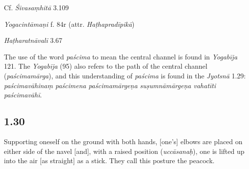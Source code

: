 \begin{ekdosis}
\begin{sources}[hp01_029]
Cf. \emph{Śivasaṃhitā} 3.109

\begin{versinnote}
\end{versinnote}

\end{sources}

\begin{testimonia}[hp01_029]
\emph{Yogacintāmaṇi} f. 84r (attr. \emph{Haṭhapradīpikā})

\begin{versinnote}
\end{versinnote}

\emph{Haṭharatnāvalī} 3.67

\begin{versinnote}
\end{versinnote}

\end{testimonia}

\begin{philcomm}[hp01_029]
 The use of the word \emph{paścima} to mean the central channel is found in \emph{Yogabīja} 121. The  \emph{Yogabīja} (95) also refers to the path of the central channel (\emph{paścima\-mārga}), and this understanding of \emph{paścima} is found in the \emph{Jyotsnā} 1.29: \emph{paścimavāhinaṃ paścimena paścimamārgeṇa suṣumnāmārgeṇa vahatīti paścimavāhī}.
\end{philcomm}

\subsection*{1.30}
\begin{translation}[hp01_030]
Supporting oneself on the ground with both hands, [one's] elbows are placed on either side of the navel [and], with a raised position (\emph{uccāsanaḥ}), one is lifted up into the air [as straight] as a stick. They call this posture the peacock.%


\end{translation}
\end{ekdosis}
